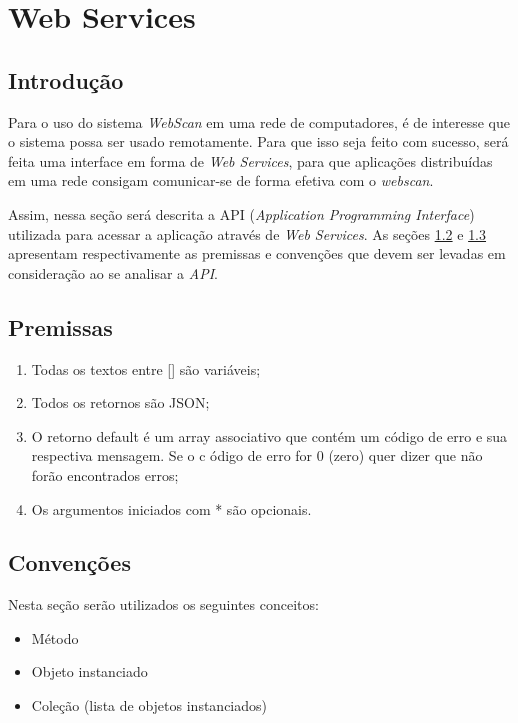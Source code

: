 
\section{Web Services}
\label{sec:web_services}

\subsection{Introdução}
Para o uso do sistema {\it WebScan} em uma rede de computadores, é de interesse que o sistema possa ser usado remotamente. Para que isso seja feito com sucesso, será feita uma interface em forma de {\it Web Services}, para que aplicações distribuídas em uma rede consigam comunicar-se de forma efetiva com o {\it webscan}.

Assim, nessa seção será descrita a API ({\it Application Programming Interface}) utilizada para acessar a aplicação através de {\it Web Services}. As seções \ref{sec:premissas} e \ref{sec:convencoes} apresentam respectivamente as premissas e convenções que devem ser levadas em consideração ao se analisar a {\it API}.  
 
\subsection{Premissas}
\label{sec:premissas}

\begin{enumerate}
    \item Todas os textos entre [] são variáveis; 
    \item Todos os retornos são JSON;
    \item O retorno default é um array associativo que contém um código de 
            erro e sua respectiva mensagem. Se o c ódigo de erro for 0 (zero)
            quer dizer que não forão encontrados erros;
    \item Os argumentos iniciados com * são opcionais.
\end{enumerate}
 
\subsection{Convenções}
\label{sec:convencoes}

Nesta seção serão utilizados os seguintes conceitos:

\begin{itemize}
    \item Método 
    \item Objeto instanciado
    \item Coleção (lista de objetos instanciados)
\end{itemize}

